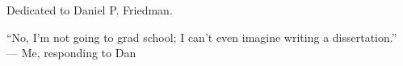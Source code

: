 \thispagestyle{empty}
{}

\vspace*{4cm}

\begin{center}
\noindent Dedicated to Daniel P. Friedman.
\end{center}

\bigskip

\begin{center}
\begin{flushright}
``No, I'm not going to grad school; I can't even imagine writing a dissertation.''\\
--- Me, responding to Dan
\end{flushright}
\end{center}

